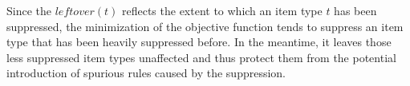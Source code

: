 Since the $leftover(t)$ reflects the extent to which an item type $t$ has been suppressed,
the minimization of the objective function tends to suppress an item type 
that has been heavily suppressed before.
In the meantime, it leaves those less suppressed item types
unaffected and thus protect them from
the potential introduction of spurious rules caused by the suppression.
%

%
%

